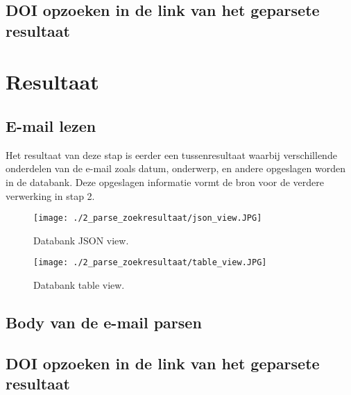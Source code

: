 \subsection{DOI opzoeken in de link van het geparsete resultaat}
\section{Resultaat}
\subsection{E-mail lezen}
Het resultaat van deze stap is eerder een tussenresultaat waarbij verschillende onderdelen van de e-mail zoals datum, onderwerp, en andere opgeslagen worden in de databank. Deze opgeslagen informatie vormt de bron voor de verdere verwerking in stap 2.
\begin{figure}
    \centering
    \texttt{[image: ./2\_parse\_zoekresultaat/json\_view.JPG]}
    \caption[Databank JSON view.]{\label{fig:Databank JSON view}Databank JSON view.}
\end{figure}
\begin{figure}
    \centering
    \texttt{[image: ./2\_parse\_zoekresultaat/table\_view.JPG]}
    \caption[Databank table view.]{\label{fig:Databank table view}Databank table view.}
\end{figure}
\FloatBarrier
\subsection{Body van de e-mail parsen}
\subsection{DOI opzoeken in de link van het geparsete resultaat}



